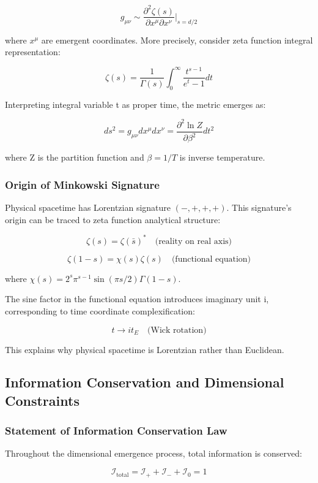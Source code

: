 \documentclass[12pt,a4paper]{article}
\begin{document}
$$g_{\mu\nu} \sim \frac{\partial^2 \zeta(s)}{\partial x^{\mu} \partial x^{\nu}} \bigg|_{s = d/2}$$

where $x^{\mu}$ are emergent coordinates. More precisely, consider zeta function integral representation:

$$\zeta(s) = \frac{1}{\Gamma(s)} \int_0^{\infty} \frac{t^{s-1}}{e^t - 1} dt$$

Interpreting integral variable t as proper time, the metric emerges as:

$$ds^2 = g_{\mu\nu} dx^{\mu} dx^{\nu} = \frac{\partial^2 \ln Z}{\partial \beta^2} dt^2$$

where Z is the partition function and $\beta = 1/T$ is inverse temperature.

\subsubsection{Origin of Minkowski Signature}

Physical spacetime has Lorentzian signature $(-,+,+,+)$. This signature's origin can be traced to zeta function analytical structure:

$$\zeta(s) = \zeta(\bar{s})^* \quad \text{(reality on real axis)}$$

$$\zeta(1-s) = \chi(s) \zeta(s) \quad \text{(functional equation)}$$

where $\chi(s) = 2^s \pi^{s-1} \sin(\pi s/2) \Gamma(1-s)$.

The sine factor in the functional equation introduces imaginary unit i, corresponding to time coordinate complexification:

$$t \to it_E \quad \text{(Wick rotation)}$$

This explains why physical spacetime is Lorentzian rather than Euclidean.

\subsection{Information Conservation and Dimensional Constraints}

\subsubsection{Statement of Information Conservation Law}

Throughout the dimensional emergence process, total information is conserved:

$$\mathcal{I}_{\text{total}} = \mathcal{I}_+ + \mathcal{I}_- + \mathcal{I}_0 = 1$$
\end{document}
